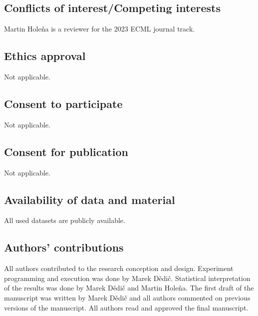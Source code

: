 \documentclass[sn-mathphys,pdflatex,iicol]{sn-jnl}%
\begin{document}
\subsection*{Conflicts of interest/Competing interests}

Martin Holeňa is a reviewer for the 2023 ECML journal track.

\subsection*{Ethics approval}

Not applicable.

\subsection*{Consent to participate}

Not applicable.

\subsection*{Consent for publication}

Not applicable.

\subsection*{Availability of data and material}

All used datasets are publicly available.


\subsection*{Authors' contributions}

All authors contributed to the research conception and design. Experiment programming and execution was done by Marek Dědič. Statistical interpretation of the results was done by Marek Dědič and Martin Holeňa. The first draft of the manuscript was written by Marek Dědič and all authors commented on previous versions of the manuscript. All authors read and approved the final manuscript.


\end{document}
